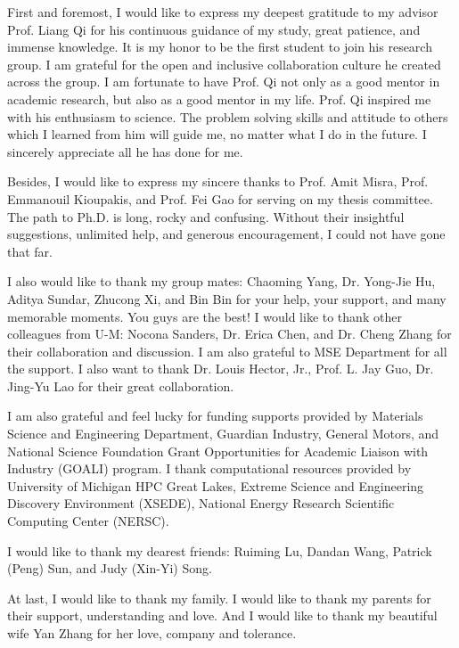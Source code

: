 First and foremost, I would like to express my deepest gratitude to my advisor Prof. Liang Qi for his continuous guidance of my study, great patience, and immense knowledge. It is my honor to be the first student to join his research group. I am grateful for the open and inclusive collaboration culture he created across the group. I am fortunate to have Prof. Qi not only as a good mentor in academic research, but also as a good mentor in my life. Prof. Qi inspired me with his enthusiasm to science. The problem solving skills and attitude to others which I learned from him will guide me, no matter what I do in the future. I sincerely appreciate all he has done for me.

Besides, I would like to express my sincere thanks to Prof. Amit Misra, Prof. Emmanouil Kioupakis, and Prof. Fei Gao for serving on my thesis committee. The path to Ph.D. is long, rocky and confusing. Without their insightful suggestions, unlimited help, and generous encouragement, I could not have gone that far.

I also would like to thank my group mates: Chaoming Yang, Dr. Yong-Jie Hu, Aditya Sundar, Zhucong Xi, and Bin Bin for your help, your support, and many memorable moments. You guys are the best! I would like to thank other colleagues from U-M: Nocona Sanders, Dr. Erica Chen, and Dr. Cheng Zhang for their collaboration and discussion. I am also grateful to MSE Department for all the support. I also want to thank Dr. Louis Hector, Jr., Prof. L. Jay Guo, Dr. Jing-Yu Lao for their great collaboration. 

I am also grateful and feel lucky for funding supports provided by Materials Science and Engineering Department, Guardian Industry, General Motors, and National Science Foundation Grant Opportunities for Academic Liaison with Industry (GOALI) program. I thank computational resources provided by University of Michigan HPC Great Lakes, Extreme Science and Engineering Discovery Environment (XSEDE),  National Energy Research Scientific Computing Center (NERSC).

I would like to thank my dearest friends: Ruiming Lu, Dandan Wang, Patrick (Peng) Sun, and Judy (Xin-Yi) Song.

At last, I would like to thank my family. I would like to thank my parents for their support, understanding and love. And I would like to thank my beautiful wife Yan Zhang for her love, company and tolerance.